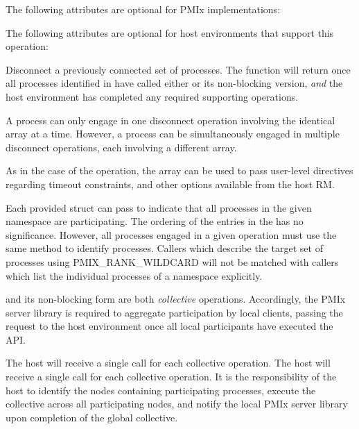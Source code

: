 \optattrstart
The following attributes are optional for \ac{PMIx} implementations:



The following attributes are optional for host environments that support this operation:


\optattrend

\descr

Disconnect a previously connected set of processes. The function will return once all processes identified in  have called either  or its non-blocking version, \textit{and} the host environment has completed any required supporting operations.

A process can only engage in one disconnect operation involving the identical  array at a time.
However, a process can be simultaneously engaged in multiple disconnect operations, each involving a different  array.

As in the case of the  operation, the  array can be used to pass user-level directives regarding timeout constraints, and other options available from the host \ac{RM}.

Each provided  struct can pass  to indicate that all processes in the given namespace are participating.
The ordering of the entries in the  has no significance.  However, all processes engaged in a given
operation must use the same method to identify processes.  Callers which describe
the target set of processes using PMIX_RANK_WILDCARD will not be matched with
callers which list the individual processes of a namespace explicitly.

\adviceimplstart
{} and its non-blocking form are both \emph{collective} operations. Accordingly, the \ac{PMIx} server library is required to aggregate participation by local clients, passing the request to the host environment once all local participants have executed the \ac{API}.
\adviceimplend

\advicermstart
The host will receive a single call for each collective operation. The host will receive a single call for each collective operation. It is the responsibility of the host to identify the nodes containing participating processes, execute the collective across all participating nodes, and notify the local \ac{PMIx} server library upon completion of the global collective.


